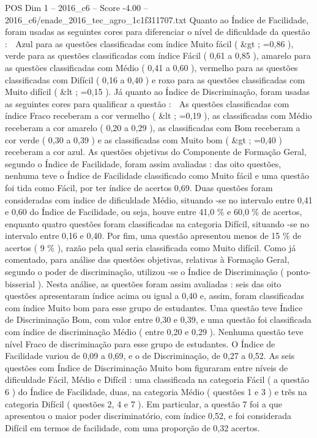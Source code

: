 \begin{textsample}{POS Dim 1 – 2016\_c6 – Score -4.00 – 2016\_c6/enade\_2016\_tec\_agro\_1c1f311707.txt}
Quanto ao Índice de Facilidade, foram usadas as seguintes cores para diferenciar o nível de dificuldade da questão :  Azul para as questões classificadas com índice Muito fácil ( \&gt ; =0,86 ), verde para as questões classificadas com índice Fácil ( 0,61 a 0,85 ), amarelo para as questões classificadas com Médio ( 0,41 a 0,60 ), vermelho para as questões classificadas com Difícil ( 0,16 a 0,40 ) e roxo para as questões classificadas com Muito difícil ( \&lt ; =0,15 ).
Já quanto ao Índice de Discriminação, foram usadas as seguintes cores para qualificar a questão :  As questões classificadas com índice Fraco receberam a cor vermelho ( \&lt ; =0,19 ), as classificadas com Médio receberam a cor amarelo ( 0,20 a 0,29 ), as classificadas com Bom receberam a cor verde ( 0,30 a 0,39 ) e as classificadas com Muito bom ( \&gt ; =0,40 ) receberam a cor azul.
As questões objetivas do Componente de Formação Geral, segundo o Índice de Facilidade, foram assim avaliadas : das oito questões, nenhuma teve o Índice de Facilidade classificado como Muito fácil e uma questão foi tida como Fácil, por ter índice de acertos 0,69.
Duas questões foram consideradas com índice de dificuldade Médio, situando -se no intervalo entre 0,41 e 0,60 do Índice de Facilidade, ou seja, houve entre 41,0 \% e 60,0 \% de acertos, enquanto quatro questões foram classificadas na categoria Difícil, situando -se no intervalo entre 0,16 e 0,40.
Por fim, uma questão apresentou menos de 15 \% de acertos ( 9 \% ), razão pela qual seria classificada como Muito difícil.
Como já comentado, para análise das questões objetivas, relativas à Formação Geral, segundo o poder de discriminação, utilizou -se o Índice de Discriminação ( ponto-bisserial ).
Nesta análise, as questões foram assim avaliadas : seis das oito questões apresentaram índice acima ou igual a 0,40 e, assim, foram classificadas com índice Muito bom para esse grupo de estudantes.
Uma questão teve Índice de Discriminação Bom, com valor entre 0,30 e 0,39, e uma questão foi classificada com índice de discriminação Médio ( entre 0,20 e 0,29 ).
Nenhuma questão teve nível Fraco de discriminação para esse grupo de estudantes.
O Índice de Facilidade variou de 0,09 a 0,69, e o de Discriminação, de 0,27 a 0,52.
As seis questões com Índice de Discriminação Muito bom figuraram entre níveis de dificuldade Fácil, Médio e Difícil : uma classificada na categoria Fácil ( a questão 6 ) do Índice de Facilidade, duas, na categoria Médio ( questões 1 e 3 ) e três na categoria Difícil ( questões 2, 4 e 7 ).
Em particular, a questão 7 foi a que apresentou o maior poder discriminatório, com índice 0,52, e foi considerada Difícil em termos de facilidade, com uma proporção de 0,32 acertos.

\end{textsample}
